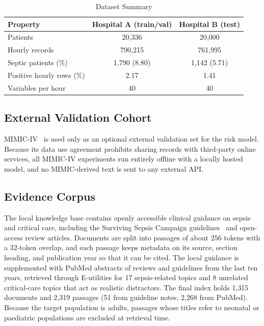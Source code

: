 \documentclass[conference]{IEEEtran}
\begin{document}
\begin{table}[!t]
\caption{Dataset Summary}
\label{tab:data}
\centering
\footnotesize
\begin{tabular}{@{}lcc@{}}
\toprule
Property & Hospital A (train/val) & Hospital B (test) \\
\midrule
Patients & 20{,}336 & 20{,}000 \\
Hourly records & 790{,}215 & 761{,}995 \\
Septic patients (\%) & 1{,}790 (8.80) & 1{,}142 (5.71) \\
Positive hourly rows (\%) & 2.17 & 1.41 \\
Variables per hour & 40 & 40 \\
\bottomrule
\end{tabular}
\end{table}

\subsection{External Validation Cohort}
MIMIC-IV~\cite{johnson2023mimiciv} is used only as an optional external
validation set for the risk model. Because its data use agreement prohibits
sharing records with third-party online services, all MIMIC-IV experiments
run entirely offline with a locally hosted model, and no MIMIC-derived text
is sent to any external API.

\subsection{Evidence Corpus}
The local knowledge base contains openly accessible clinical guidance on
sepsis and critical care, including the Surviving Sepsis Campaign
guidelines~\cite{evans2021ssc} and open-access review articles. Documents
are split into passages of about 256 tokens with a 32-token overlap, and
each passage keeps metadata on its source, section heading, and
publication year so that it can be cited. The local guidance is
supplemented with PubMed abstracts of reviews and guidelines from the last
ten years, retrieved through E-utilities for 17 sepsis-related topics and
8 unrelated critical-care topics that act as realistic distractors. The final
index holds 1{,}315 documents and 2{,}319 passages (51 from guideline notes,
2{,}268 from PubMed). Because the target population is adults, passages whose
titles refer to neonatal or paediatric populations are excluded at
retrieval time.
\end{document}
